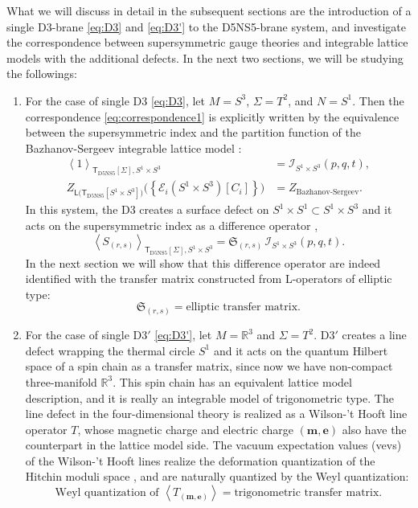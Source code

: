 What we will discuss in detail in the subsequent sections
are the introduction of a single D3-brane \eqref{eq:D3} and \eqref{eq:D3'} to the
D5NS5-brane system, and investigate the correspondence between supersymmetric gauge theories
and integrable lattice models with the additional
defects. In the next two sections, we will be studying the followings:
\begin{enumerate}
	\item For the case of single D3 \eqref{eq:D3}, let $M=S^{3}$, $\Sigma=T^{2}$, and $N=S^{1}$.
Then the correspondence \eqref{eq:correspondence1} is explicitly written by the equivalence between
the supersymmetric index and the partition function of the Bazhanov-Sergeev integrable lattice model
\cite{Bazhanov:2010kz,Bazhanov:2011mz,Spiridonov:2010em,Yamazaki:2012cp}:
\begin{align}
  \left\langle  1  \right\rangle_{\mathsf{T}_{\mathrm{D5NS5}}[\Sigma],S^{1}\times S^{3}}
    &  =  \mathcal{I}_{S^{1}\times S^{3}}(p,q,t),\\
  Z_{\mathsf{L}\big(\mathsf{T}_{\mathrm{D5NS5}}[S^{1}\times S^{3}]\big)}
    \big( \left\{ \mathcal{E}_{i}(S^{1}\times S^{3})[C_i]\right\} \big)
    &  =  Z_{\text{Bazhanov-Sergeev}}.
\end{align}
In this system, the D3 creates a surface defect on $S^{1}\times S^{1} \subset S^1\times S^3$ and it
acts on the supersymmetric index as a difference operator \cite{Gaiotto:2012xa,Gadde:2013dda},
\begin{equation}
  \left\langle S_{(r,s)}\right\rangle_{\mathsf{T}_{\mathrm{D5NS5}}[\Sigma], S^1\times S^3}
    =
      \mathfrak{S}_{(r,s)} \, \mathcal{I}_{S^{1}\times S^{3}}(p,q,t).
\end{equation}
In the next section we will show that this difference operator are indeed identified with
the transfer matrix constructed from L-operators of elliptic type:
\begin{equation}
  \mathfrak{S}_{(r,s)}
  = \textrm{elliptic transfer matrix.}
\end{equation}
\item For the case of single D3$'$ \eqref{eq:D3'}, let $M=\mathbb{R}^{3}$ and $\Sigma=T^{2}$.
D3$'$ creates a line defect wrapping the thermal circle $S^{1}$ and it acts on the quantum
Hilbert space of a spin chain as a transfer matrix, since now we have
non-compact three-manifold $\mathbb{R}^{3}$.
This spin chain has an equivalent lattice model description, and it is really an integrable model of
trigonometric type. The line defect in the
four-dimensional theory is realized as a Wilson-'t Hooft line operator
$T$, whose magnetic charge and electric charge $(\mathbf{m},\mathbf{e})$
also have the counterpart in the lattice model side.
The vacuum expectation values (vevs) of the Wilson-'t Hooft
lines realize the deformation quantization of the Hitchin moduli space \cite{Gaiotto:2010be,Ito:2011ea},
and are naturally quantized by the Weyl quantization:
\begin{equation}
  \textrm{Weyl quantization of }  \left\langle  T_{\left(\mathbf{m},\mathbf{e}\right)}  \right\rangle
  =  \textrm{trigonometric transfer matrix.}
\end{equation}
\end{enumerate}
